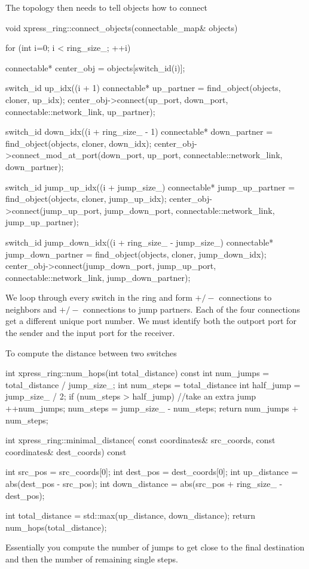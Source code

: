 The topology then needs to tell objects how to connect

\begin{CppCode}
void xpress_ring::connect_objects(connectable_map& objects)
{
  for (int i=0; i < ring_size_; ++i) {
    connectable* center_obj = objects[switch_id(i)];

    switch_id up_idx((i + 1) %
    connectable* up_partner = find_object(objects, cloner, up_idx);
    center_obj->connect(up_port, down_port, connectable::network_link, up_partner);

    switch_id down_idx((i + ring_size_ - 1) %
    connectable* down_partner = find_object(objects, cloner, down_idx);
    center_obj->connect_mod_at_port(down_port, up_port, connectable::network_link,
                                    down_partner);

    switch_id jump_up_idx((i + jump_size_) %
    connectable* jump_up_partner = find_object(objects, cloner, jump_up_idx);
    center_obj->connect(jump_up_port, jump_down_port, connectable::network_link,
                                    jump_up_partner);

    switch_id jump_down_idx((i + ring_size_ - jump_size_) %
    connectable* jump_down_partner = find_object(objects, cloner,
                                         jump_down_idx);
    center_obj->connect(jump_down_port, jump_up_port, connectable::network_link,
                                    jump_down_partner);
  }
}
\end{CppCode}
We loop through every switch in the ring and form $+/-$ connections to neighbors and $+/-$ connections to jump partners.
Each of the four connections get a different unique port number.  We must identify both the outport port for the sender and the input port for the receiver.

To compute the distance between two switches

\begin{CppCode}
int xpress_ring::num_hops(int total_distance) const
{
  int num_jumps = total_distance / jump_size_;
  int num_steps = total_distance %
  int half_jump = jump_size_ / 2;
  if (num_steps > half_jump) {
    //take an extra jump
    ++num_jumps;
    num_steps = jump_size_ - num_steps;
  }
  return num_jumps + num_steps;
}

int
xpress_ring::minimal_distance(
  const coordinates& src_coords,
  const coordinates& dest_coords) const
{
  int src_pos = src_coords[0];
  int dest_pos = dest_coords[0];
  int up_distance = abs(dest_pos - src_pos);
  int down_distance = abs(src_pos + ring_size_ - dest_pos);

  int total_distance = std::max(up_distance, down_distance);
  return num_hops(total_distance);
}
\end{CppCode}
Essentially you compute the number of jumps to get close to the final destination and then the number of remaining single steps.

